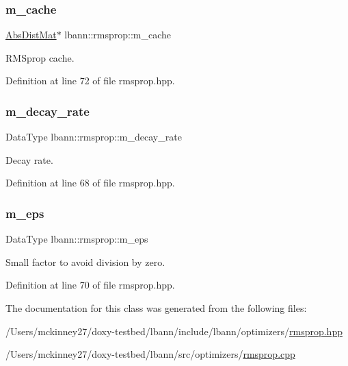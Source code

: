 \subsubsection{\texorpdfstring{m\+\_\+cache}{m\_cache}}
{\footnotesize\ttfamily \hyperlink{base_8hpp_a9a697a504ae84010e7439ffec862b470}{Abs\+Dist\+Mat}$\ast$ lbann\+::rmsprop\+::m\+\_\+cache\hspace{0.3cm}{\ttfamily [private]}}

R\+M\+Sprop cache. 

Definition at line 72 of file rmsprop.\+hpp.

\mbox{\label{classlbann_1_1rmsprop_a9cd712c44e7c4995120e2933b0387d71}} 
\subsubsection{\texorpdfstring{m\+\_\+decay\+\_\+rate}{m\_decay\_rate}}
{\footnotesize\ttfamily Data\+Type lbann\+::rmsprop\+::m\+\_\+decay\+\_\+rate\hspace{0.3cm}{\ttfamily [private]}}

Decay rate. 

Definition at line 68 of file rmsprop.\+hpp.

\mbox{\label{classlbann_1_1rmsprop_a6ea73caf5b2769451dfd798665877208}} 
\subsubsection{\texorpdfstring{m\+\_\+eps}{m\_eps}}
{\footnotesize\ttfamily Data\+Type lbann\+::rmsprop\+::m\+\_\+eps\hspace{0.3cm}{\ttfamily [private]}}

Small factor to avoid division by zero. 

Definition at line 70 of file rmsprop.\+hpp.



The documentation for this class was generated from the following files\+:\begin{DoxyCompactItemize}
\item 
/\+Users/mckinney27/doxy-\/testbed/lbann/include/lbann/optimizers/\hyperlink{rmsprop_8hpp}{rmsprop.\+hpp}\item 
/\+Users/mckinney27/doxy-\/testbed/lbann/src/optimizers/\hyperlink{rmsprop_8cpp}{rmsprop.\+cpp}\end{DoxyCompactItemize}
